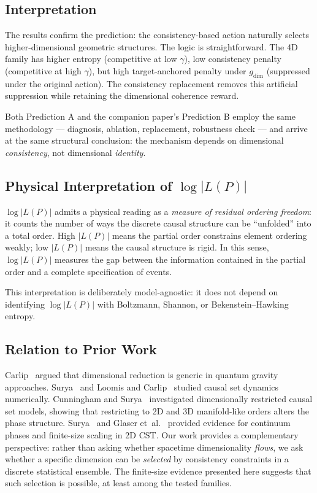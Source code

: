 \documentclass[11pt,a4paper]{article}
\begin{document}
\subsection{Interpretation}

The results confirm the prediction: the consistency-based action naturally selects higher-dimensional geometric structures. The logic is straightforward. The 4D family has higher entropy (competitive at low $\gamma$), low consistency penalty (competitive at high $\gamma$), but high target-anchored penalty under $g_{\text{dim}}$ (suppressed under the original action). The consistency replacement removes this artificial suppression while retaining the dimensional coherence reward.

Both Prediction A and the companion paper's Prediction B employ the same methodology --- diagnosis, ablation, replacement, robustness check --- and arrive at the same structural conclusion: the mechanism depends on dimensional \emph{consistency}, not dimensional \emph{identity}.

\subsection{Physical Interpretation of $\log|L(P)|$}

$\log|L(P)|$ admits a physical reading as a \emph{measure of residual ordering
freedom}: it counts the number of ways the discrete causal structure can be
``unfolded'' into a total order. High $|L(P)|$ means the partial order
constrains element ordering weakly; low $|L(P)|$ means the causal structure is
rigid. In this sense, $\log|L(P)|$ measures the gap between the information
contained in the partial order and a complete specification of events.

This interpretation is deliberately model-agnostic: it does not depend on
identifying $\log|L(P)|$ with Boltzmann, Shannon, or Bekenstein--Hawking
entropy.

\subsection{Relation to Prior Work}

Carlip~\cite{carlip2017} argued that dimensional reduction is generic in quantum gravity approaches. Surya~\cite{surya2019} and Loomis and Carlip~\cite{loomis2018} studied causal set dynamics numerically. Cunningham and Surya~\cite{cunningham2020} investigated dimensionally restricted causal set models, showing that restricting to 2D and 3D manifold-like orders alters the phase structure. Surya~\cite{surya2012} and Glaser et~al.~\cite{glaser2018} provided evidence for continuum phases and finite-size scaling in 2D CST. Our work provides a complementary perspective: rather than asking whether spacetime dimensionality \emph{flows}, we ask whether a specific dimension can be \emph{selected} by consistency constraints in a discrete statistical ensemble. The finite-size evidence presented here suggests that such selection is possible, at least among the tested families.
\end{document}
